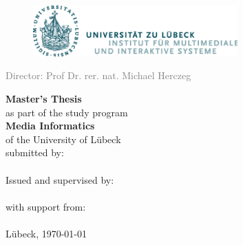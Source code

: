 \begin{titlepage}
    \begin{figure}[t]
        \centering
        \includegraphics[width=0.7\textwidth]{img/UzL_Logo.png}
    \end{figure}
    \begin{center}
        \selectfont
        \textcolor{gray}{Director: Prof Dr. rer. nat. Michael Herczeg}\\
        \vspace*{1.5cm}
        \Large
        \begin{onehalfspace}
            \textbf{\titelMAEnglish}
        \end{onehalfspace}
        \vspace{1cm}
        \normalsize
        \textbf{Master's Thesis}\\
        \vspace{0.2cm}
        as part of the study program\\
        \textbf{Media Informatics}\\
        of the University of Lübeck\\
        \vspace{1cm}
        submitted by:\\ \textbf{\authorMA}\\
        \vspace{1cm}
        Issued and supervised by:\\ \textbf{\examinerMA}\\
        \vspace{0.5cm}
        with support from:\\ \textbf{\supporterMA}\\
        \vspace{1cm}
        Lübeck, \today
    \end{center}        
\end{titlepage}